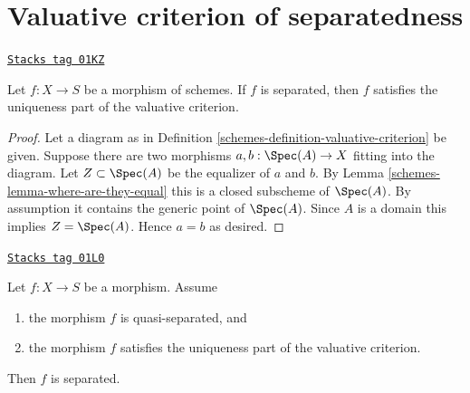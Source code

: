 \section{Valuative criterion of separatedness}
\label{schemes-section-valuative-separatedness}
\begin{lemma}
\label{schemes-lemma-separated-implies-valuative}
\href{https://stacks.math.columbia.edu/tag/01KZ}{\texttt{Stacks tag 01KZ}}

Let $f : X \to S$ be a morphism of schemes.
If $f$ is separated, then $f$ satisfies the uniqueness
part of the valuative criterion.
\end{lemma}

\begin{proof}

Let a diagram as in Definition \ref{schemes-definition-valuative-criterion}
be given. Suppose there are two morphisms
$a, b : \Spec(A) \to X$ fitting into the diagram.
Let $Z \subset \Spec(A)$ be the equalizer of $a$ and $b$.
By Lemma \ref{schemes-lemma-where-are-they-equal} this is a closed
subscheme of $\Spec(A)$. By assumption it contains
the generic point of $\Spec(A)$. Since $A$ is a domain
this implies $Z = \Spec(A)$. Hence $a = b$ as desired.
\end{proof}

\begin{lemma}

\label{schemes-lemma-valuative-criterion-separatedness}
\href{https://stacks.math.columbia.edu/tag/01L0}{\texttt{Stacks tag 01L0}}

\begin{reference}
\cite[II Proposition 7.2.3]{EGA}
\end{reference}
Let $f : X \to S$ be a morphism.
Assume
\begin{enumerate}
\item the morphism $f$ is quasi-separated, and
\item the morphism $f$ satisfies the uniqueness
part of the valuative criterion.
\end{enumerate}
Then $f$ is separated.
\end{lemma}

